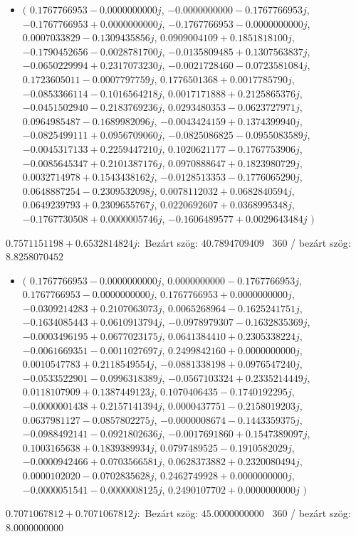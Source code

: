 \documentclass[14pt,a4paper]{article}
\begin{document}
\begin{itemize}
\item
$\big($
$0.1767766953-0.0000000000j$, $-0.0000000000-0.1767766953j$, $-0.1767766953+0.0000000000j$, $-0.1767766953-0.0000000000j$, $0.0007033829-0.1309435856j$, $0.0909004109+0.1851818100j$, $-0.1790452656-0.0028781700j$, $-0.0135809485+0.1307563837j$, $-0.0650229994+0.2317073230j$, $-0.0021728460-0.0723581084j$, $0.1723605011-0.0007797759j$, $0.1776501368+0.0017785790j$, $-0.0853366114-0.1016564218j$, $0.0017171888+0.2125865376j$, $-0.0451502940-0.2183769236j$, $0.0293480353-0.0623727971j$, $0.0964985487-0.1689982096j$, $-0.0043424159+0.1374399940j$, $-0.0825499111+0.0956709060j$, $-0.0825086825-0.0955083589j$, $-0.0045317133+0.2259447210j$, $0.1020621177-0.1767753906j$, $-0.0085645347+0.2101387176j$, $0.0970888647+0.1823980729j$, $0.0032714978+0.1543438162j$, $-0.0128513353-0.1776065290j$, $0.0648887254-0.2309532098j$, $0.0078112032+0.0682840594j$, $0.0649239793+0.2309655767j$, $0.0220692607+0.0368995348j$, $-0.1767730508+0.0000005746j$, $-0.1606489577+0.0029643484j$
$\big)$
\end{itemize}
$0.7571151198+0.6532814824j$:\
Bezárt szög: $40.7894709409$ \
360 / bezárt szög: $8.8258070452$\
\begin{itemize}
\item
$\big($
$0.1767766953-0.0000000000j$, $0.0000000000-0.1767766953j$, $0.1767766953-0.0000000000j$, $0.1767766953+0.0000000000j$, $-0.0309214283+0.2107063073j$, $0.0065268964-0.1625241751j$, $-0.1634085443+0.0610913794j$, $-0.0978979307-0.1632835369j$, $-0.0003496195+0.0677023175j$, $0.0641384410+0.2305338224j$, $-0.0061669351-0.0011027697j$, $0.2499842160+0.0000000000j$, $0.0010547783+0.2118549554j$, $-0.0881338198+0.0976547240j$, $-0.0533522901-0.0996318389j$, $-0.0567103324+0.2335214449j$, $0.0118107909+0.1387449123j$, $0.1070406435-0.1740192295j$, $-0.0000001438+0.2157141394j$, $0.0000437751-0.2158019203j$, $0.0637981127-0.0857802275j$, $-0.0000008674-0.1443359375j$, $-0.0988492141-0.0921802636j$, $-0.0017691860+0.1547389097j$, $0.1003165638+0.1839389934j$, $0.0797489525-0.1910582029j$, $-0.0000942466+0.0703566581j$, $0.0628373882+0.2320080494j$, $0.0000102020-0.0702835628j$, $0.2462749928+0.0000000000j$, $-0.0000051541-0.0000008125j$, $0.2490107702+0.0000000000j$
$\big)$
\end{itemize}
$0.7071067812+0.7071067812j$:\
Bezárt szög: $45.0000000000$ \
360 / bezárt szög: $8.0000000000$\
\end{document}
